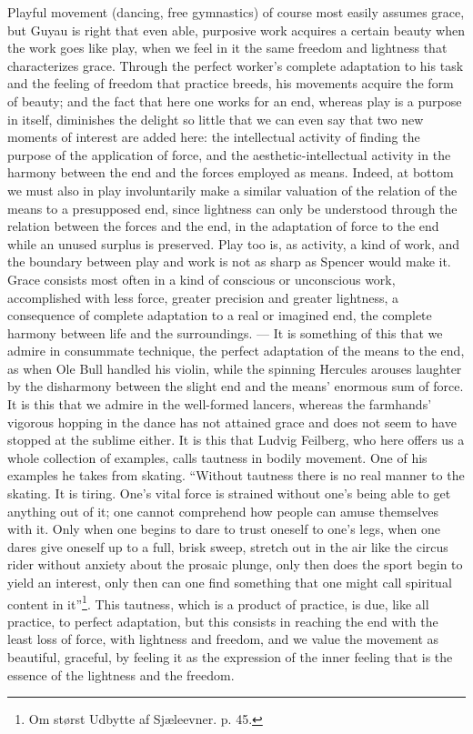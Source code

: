 \documentclass[12pt,a4paper,openany]{book}
\newcommand{\opage}[1]{\marginnote{\footnotesize\textit{[#1]}}}
\begin{document}
Playful movement (dancing, free gymnastics) of course
most easily assumes grace, but Guyau is right that even
able, purposive work acquires a certain beauty
when the work goes like play, when we feel in it the same
freedom and lightness that characterizes grace. Through the perfect
worker's complete adaptation to his task and
the feeling of freedom that practice breeds, his movements acquire
the form of beauty; and the fact that here one works for an end, whereas
play is a purpose in itself, diminishes the delight so little
that we can even say that two new
moments of interest are added here: the intellectual activity of
finding the purpose of the application of force, and the aesthetic-intellectual
activity in the harmony between the end and the forces employed as
means. Indeed, at bottom we must also in play
involuntarily make a similar valuation of the relation of the means
to a presupposed end, since lightness can only be understood through
the relation between the forces and the end, in the adaptation of force
to the end while an unused surplus is preserved. Play too
is, as activity, a kind of work, and the boundary
between play and work is not as sharp as Spencer would make
it. Grace consists most often in a kind of conscious or unconscious
work, accomplished with less force, greater precision and greater
lightness, a consequence of complete adaptation to a real
or imagined end, the complete harmony between life
and the surroundings. --- It is something of this that we admire in
consummate technique, the perfect adaptation of the means to
\setcounter{footnote}{0}%
\opage{272}the end, as when Ole Bull handled his violin, while
the spinning Hercules arouses laughter by the disharmony
between the slight end and the means' enormous sum of force. It
is this that we admire in the well-formed lancers, whereas the farmhands'
vigorous hopping in the dance has not attained grace
and does not seem to have stopped at the sublime either.
It is this that Ludvig Feilberg, who here offers us a whole
collection of examples, calls tautness in bodily movement. One
of his examples he takes from skating. ``Without tautness
there is no real manner to the skating. It is tiring. One's
vital force is strained without one's being able to get anything out of it; one
cannot comprehend how people can amuse themselves with it. Only
when one begins to dare to trust oneself to one's legs, when
one dares give oneself up to a full, brisk sweep, stretch out in
the air like the circus rider without anxiety about the prosaic
plunge, only then does the sport begin to yield an interest,
only then can one find something that one might call spiritual
content in it''\footnote[1]{Om størst Udbytte af Sjæleevner. p. 45.}. This tautness, which is a product of
practice, is due, like all practice, to perfect adaptation,
but this consists in reaching the end with the least loss of force,
with lightness and freedom, and we value the movement as beautiful,
graceful, by feeling it as the expression of the inner feeling that
is the essence of the lightness and the freedom.
\end{document}
